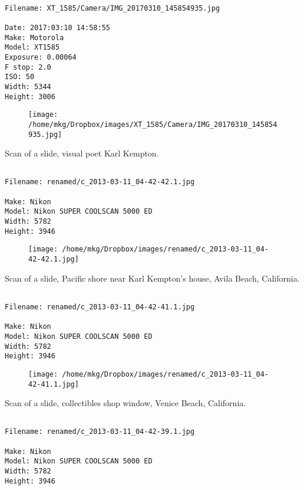 \clearpage
\onecolumn
\noindent 
\noindent
\begin{lstlisting}

Filename: XT_1585/Camera/IMG_20170310_145854935.jpg

Date: 2017:03:10 14:58:55
Make: Motorola
Model: XT1585
Exposure: 0.00064
F stop: 2.0
ISO: 50
Width: 5344
Height: 3006
\end{lstlisting}
\clearpage

\begin{figure}
\texttt{[image: /home/mkg/Dropbox/images/XT\_1585/Camera/IMG\_20170310\_145854935.jpg]}
\end{figure}
    
\clearpage
\onecolumn
\noindent Scan of a slide, visual poet Karl Kempton.
\noindent
\begin{lstlisting}

Filename: renamed/c_2013-03-11_04-42-42.1.jpg

Make: Nikon
Model: Nikon SUPER COOLSCAN 5000 ED
Width: 5782
Height: 3946
\end{lstlisting}
\clearpage

\begin{figure}
\texttt{[image: /home/mkg/Dropbox/images/renamed/c\_2013-03-11\_04-42-42.1.jpg]}
\end{figure}
    
\clearpage
\onecolumn
\noindent Scan of a slide, Pacific shore near Karl Kempton's house, Avila Beach, California.
\noindent
\begin{lstlisting}

Filename: renamed/c_2013-03-11_04-42-41.1.jpg

Make: Nikon
Model: Nikon SUPER COOLSCAN 5000 ED
Width: 5782
Height: 3946
\end{lstlisting}
\clearpage

\begin{figure}
\texttt{[image: /home/mkg/Dropbox/images/renamed/c\_2013-03-11\_04-42-41.1.jpg]}
\end{figure}
    
\clearpage
\onecolumn
\noindent Scan of a slide, collectibles shop window, Venice Beach, California.
\noindent
\begin{lstlisting}

Filename: renamed/c_2013-03-11_04-42-39.1.jpg

Make: Nikon
Model: Nikon SUPER COOLSCAN 5000 ED
Width: 5782
Height: 3946
\end{lstlisting}
\clearpage

